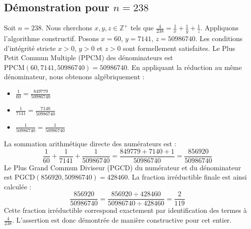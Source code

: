 \documentclass[11pt,a4paper]{article}
\begin{document}
\subsection{Démonstration pour $n = 238$}
Soit $n = 238$. Nous cherchons $x, y, z \in \mathbb{Z}^{+}$ tels que $\frac{4}{238} = \frac{1}{x} + \frac{1}{y} + \frac{1}{z}$.
Appliquons l'algorithme constructif. Posons $x = 60$, $y = 7141$, $z = 50986740$.
Les conditions d'intégrité stricte $x > 0$, $y > 0$ et $z > 0$ sont formellement satisfaites.
Le Plus Petit Commun Multiple (PPCM) des dénominateurs est $\text{PPCM}(60, 7141, 50986740) = 50986740$.
En appliquant la réduction au même dénominateur, nous obtenons algébriquement :
\begin{itemize}
    \item $\frac{1}{60} = \frac{849779}{50986740}$
    \item $\frac{1}{7141} = \frac{7140}{50986740}$
    \item $\frac{1}{50986740} = \frac{1}{50986740}$
\end{itemize}
La sommation arithmétique directe des numérateurs est :
$$ \frac{1}{60} + \frac{1}{7141} + \frac{1}{50986740} = \frac{849779 + 7140 + 1}{50986740} = \frac{856920}{50986740} $$
Le Plus Grand Commun Diviseur (PGCD) du numérateur et du dénominateur est $\text{PGCD}(856920, 50986740) = 428460$.
La fraction irréductible finale est ainsi calculée :
$$ \frac{856920}{50986740} = \frac{856920 \div 428460}{50986740 \div 428460} = \frac{2}{119} $$
Cette fraction irréductible correspond exactement par identification des termes à $\frac{4}{238}$. L'assertion est donc démontrée de manière constructive pour cet entier.
\end{document}
